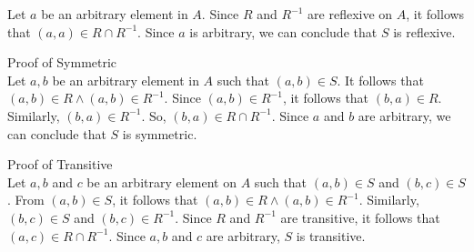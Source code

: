 \documentclass{article}
\begin{document}
Let $a$ be an arbitrary element in $A$. Since $R$ and $R^{-1}$ are
reflexive on $A$, it follows that $(a,a) \in R \cap R^{-1}$. Since $a$
is arbitrary, we can conclude that $S$ is reflexive.

Proof of Symmetric \\

Let $a,b$ be an arbitrary element in $A$ such that $(a,b) \in S$. It
follows that $(a,b) \in R \land (a,b) \in R^{-1}$. Since $(a,b) \in
R^{-1}$, it follows that $(b,a) \in R$. Similarly, $(b,a) \in R^{-1}$.
So, $(b,a) \in R \cap R^{-1}$. Since $a$ and $b$ are arbitrary, we can
conclude that $S$ is symmetric.

Proof of Transitive \\

Let $a,b$ and $c$ be an arbitrary element on $A$ such that $(a,b) \in
S$ and $(b,c) \in S$. From $(a,b) \in S$, it follows that $(a,b) \in R
\land (a,b) \in R^{-1}$. Similarly, $(b,c) \in S$ and $(b,c) \in
R^{-1}$. Since $R$ and $R^{-1}$ are transitive, it follows that $(a,c)
\in R \cap R^{-1}$. Since $a,b$ and $c$ are arbitrary, $S$ is transitive.
\end{document}
